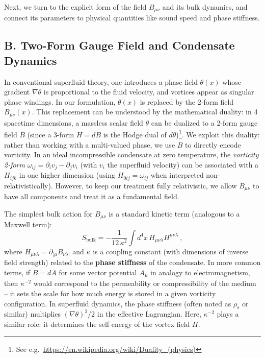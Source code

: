 \documentclass[12pt]{article}
\begin{document}
Next, we turn to the explicit form of the field $B_{\mu\nu}$ and its bulk dynamics, and connect its parameters to physical quantities like sound speed and phase stiffness.

\subsection*{B. Two-Form Gauge Field and Condensate Dynamics}

In conventional superfluid theory, one introduces a phase field $\theta(x)$ whose gradient $\nabla\theta$ is proportional to the fluid velocity, and vortices appear as singular phase windings. In our formulation, $\theta(x)$ is replaced by the 2-form field $B_{\mu\nu}(x)$. This replacement can be understood by the mathematical duality: in 4 spacetime dimensions, a massless scalar field $\theta$ can be dualized to a 2-form gauge field $B$ (since a 3-form $H=dB$ is the Hodge dual of $d\theta$)\footnote{See e.g.\ \url{https://en.wikipedia.org/wiki/Duality_(physics)}}. We exploit this duality: rather than working with a multi-valued phase, we use $B$ to directly encode vorticity. In an ideal incompressible condensate at zero temperature, the \emph{vorticity 2-form} $\omega_{ij} = \partial_i v_j - \partial_j v_i$ (with $v_i$ the superfluid velocity) can be associated with a $H_{ijk}$ in one higher dimension (using $H_{0ij} = \omega_{ij}$ when interpreted non-relativistically). However, to keep our treatment fully relativistic, we allow $B_{\mu\nu}$ to have all components and treat it as a fundamental field.

The simplest bulk action for $B_{\mu\nu}$ is a standard kinetic term (analogous to a Maxwell term):
\begin{equation}
S_{\text{bulk}} = -\frac{1}{12\,\kappa^2} \int d^4x\, H_{\mu\nu\lambda} H^{\mu\nu\lambda}~,
\label{eq:bulk_action}
\end{equation}
where $H_{\mu\nu\lambda}=\partial_{[\mu}B_{\nu\lambda]}$ and $\kappa$ is a coupling constant (with dimensions of inverse field strength) related to the \textbf{phase stiffness} of the condensate. In more common terms, if $B=dA$ for some vector potential $A_\mu$ in analogy to electromagnetism, then $\kappa^{-2}$ would correspond to the permeability or compressibility of the medium -- it sets the scale for how much energy is stored in a given vorticity configuration. In superfluid dynamics, the phase stiffness (often noted as $\rho_s$ or similar) multiplies $(\nabla\theta)^2/2$ in the effective Lagrangian. Here, $\kappa^{-2}$ plays a similar role: it determines the self-energy of the vortex field $H$.
\end{document}
